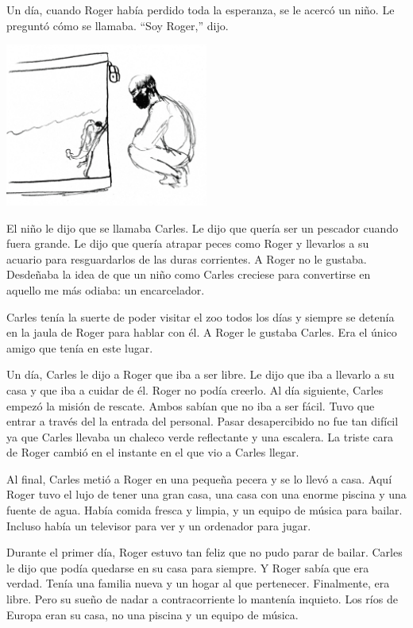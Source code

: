\documentclass[letterpaper,11pt]{report}
\begin{document}
Un día, cuando Roger había perdido toda la esperanza, se le acercó un niño. Le preguntó cómo se llamaba. “Soy Roger,” dijo.

\begin{center}
    \includegraphics[width=0.5\textwidth]{3}
\end{center}

El niño le dijo que se llamaba Carles. Le dijo que quería ser un pescador cuando fuera grande. Le dijo que quería atrapar peces como Roger y llevarlos a su acuario para resguardarlos de las duras corrientes. A Roger no le gustaba. Desdeñaba la idea de que un niño como Carles creciese para convertirse en aquello me más odiaba: un encarcelador.

Carles tenía la suerte de poder visitar el zoo todos los días y siempre se detenía en la jaula de Roger para hablar con él. A Roger le gustaba Carles. Era el único amigo que tenía en este lugar.

Un día, Carles le dijo a Roger que iba a ser libre. Le dijo que iba a llevarlo a su casa y que iba a cuidar de él. Roger no podía creerlo. Al día siguiente, Carles empezó la misión de rescate. Ambos sabían que no iba a ser fácil. Tuvo que entrar a través del la entrada del personal. Pasar desapercibido no fue tan difícil ya que Carles llevaba un chaleco verde reflectante y una escalera. La triste cara de Roger cambió en el instante en el que vio a Carles llegar.

Al final, Carles metió a Roger en una pequeña pecera y se lo llevó a casa. Aquí Roger tuvo el lujo de tener una gran casa, una casa con una enorme piscina y una fuente de agua. Había comida fresca y limpia, y un equipo de música para bailar. Incluso había un televisor para ver y un ordenador para jugar.

Durante el primer día, Roger estuvo tan feliz que no pudo parar de bailar. Carles le dijo que podía quedarse en su casa para siempre. Y Roger sabía que era verdad. Tenía una familia nueva y un hogar al que pertenecer. Finalmente, era libre.  Pero su sueño de nadar a contracorriente lo mantenía inquieto. Los ríos de Europa eran su casa, no una piscina y un equipo de música.
\end{document}
